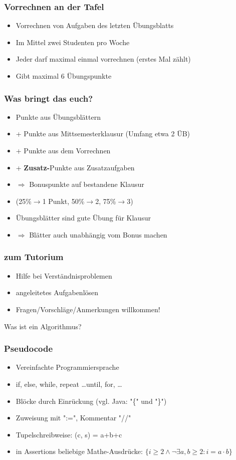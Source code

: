 \begin{frame}
\frametitle{Vorrechnen an der Tafel}
\begin{itemize}
\item Vorrechnen von Aufgaben des letzten Übungsblatts
\item Im Mittel zwei Studenten pro Woche
\item Jeder darf maximal einmal vorrechnen (erstes Mal zählt)
\item Gibt maximal 6 Übungspunkte
\end{itemize}
\end{frame}

\begin{frame}
\frametitle{Was bringt das euch?}
\begin{itemize}
\item Punkte aus Übungsblättern
\item + Punkte aus Mittsemesterklausur (Umfang etwa 2 ÜB)
\item + Punkte aus dem Vorrechnen
\item + \textbf{Zusatz-}Punkte aus Zusatzaufgaben
\item $\Rightarrow$ Bonuspunkte auf bestandene Klausur
\item (25\%$\to$1 Punkt, 50\%$\to$2, 75\%$\to$3) \pause
\item Übungsblätter sind gute Übung für Klausur
\item $\Rightarrow$ Blätter auch unabhängig vom Bonus machen
\end{itemize}
\end{frame}

\begin{frame}
\frametitle{zum Tutorium}
\begin{itemize}
\item Hilfe bei Verständnisproblemen \pause
\item angeleitetes Aufgabenlösen \pause
\item Fragen/Vorschläge/Anmerkungen willkommen!
\end{itemize}
\end{frame}

\begin{frame}
Was ist ein Algorithmus?
\end{frame}

\begin{frame}
\frametitle{Pseudocode}
\begin{itemize}
\item Vereinfachte Programmiersprache \pause
\item if, else, while, repeat \dots until, for, \dots \pause
\item Blöcke durch Einrückung (vgl. Java: "\{" und "\}") \pause
\item Zuweisung mit ":=", Kommentar "//"
\item Tupelschreibweise: (c, s) = a+b+c \pause
\item in Assertions beliebige Mathe-Ausdrücke: $\{i\geq 2\wedge \neg\exists a,b\geq 2: i=a\cdot b\}$
\end{itemize}
\end{frame}

